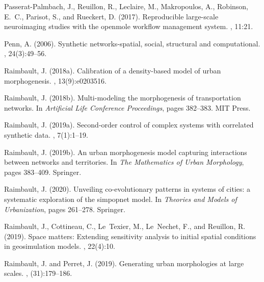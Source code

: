 \documentclass[11pt]{article}
\begin{document}
\begin{thebibliography}{}
Passerat-Palmbach, J., Reuillon, R., Leclaire, M., Makropoulos, A., Robinson,
  E.~C., Parisot, S., and Rueckert, D. (2017).
\newblock Reproducible large-scale neuroimaging studies with the openmole
  workflow management system.
, 11:21.

Penn, A. (2006).
\newblock Synthetic networks-spatial, social, structural and computational.
, 24(3):49--56.

Raimbault, J. (2018a).
\newblock Calibration of a density-based model of urban morphogenesis.
, 13(9):e0203516.

Raimbault, J. (2018b).
\newblock Multi-modeling the morphogenesis of transportation networks.
\newblock In {\em Artificial Life Conference Proceedings}, pages 382--383. MIT
  Press.

Raimbault, J. (2019a).
\newblock Second-order control of complex systems with correlated synthetic
  data.
, 7(1):1--19.

Raimbault, J. (2019b).
\newblock An urban morphogenesis model capturing interactions between networks
  and territories.
\newblock In {\em The Mathematics of Urban Morphology}, pages 383--409.
  Springer.

Raimbault, J. (2020).
\newblock Unveiling co-evolutionary patterns in systems of cities: a systematic
  exploration of the simpopnet model.
\newblock In {\em Theories and Models of Urbanization}, pages 261--278.
  Springer.

Raimbault, J., Cottineau, C., Le~Texier, M., Le~Nechet, F., and Reuillon, R.
  (2019).
\newblock Space matters: Extending sensitivity analysis to initial spatial
  conditions in geosimulation models.
,
  22(4):10.

Raimbault, J. and Perret, J. (2019).
\newblock Generating urban morphologies at large scales.
, (31):179--186.


\end{thebibliography}
\end{document}
